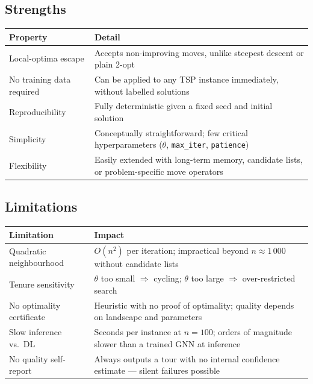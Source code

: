 \documentclass[12pt,a4paper]{article}
\begin{document}
\subsection*{Strengths}

\begin{center}
\begin{tabularx}{\linewidth}{lX}
\toprule
\textbf{Property} & \textbf{Detail} \\
\midrule
Local-optima escape & Accepts non-improving moves, unlike steepest descent or
  plain 2-opt \\
No training data required & Can be applied to any TSP instance immediately,
  without labelled solutions \\
Reproducibility & Fully deterministic given a fixed seed and initial solution \\
Simplicity & Conceptually straightforward; few critical hyperparameters
  ($\theta$, \texttt{max\_iter}, \texttt{patience}) \\
Flexibility & Easily extended with long-term memory, candidate lists, or
  problem-specific move operators \\
\bottomrule
\end{tabularx}
\end{center}

\subsection*{Limitations}

\begin{center}
\begin{tabularx}{\linewidth}{lX}
\toprule
\textbf{Limitation} & \textbf{Impact} \\
\midrule
Quadratic neighbourhood & $O(n^2)$ per iteration; impractical beyond
  $n \approx 1\,000$ without candidate lists \\
Tenure sensitivity & $\theta$ too small $\Rightarrow$ cycling;
  $\theta$ too large $\Rightarrow$ over-restricted search \\
No optimality certificate & Heuristic with no proof of optimality;
  quality depends on landscape and parameters \\
Slow inference vs.\ DL & Seconds per instance at $n = 100$; orders of
  magnitude slower than a trained GNN at inference \\
No quality self-report & Always outputs a tour with no internal confidence
  estimate --- silent failures possible \\
\bottomrule
\end{tabularx}
\end{center}
\end{document}

